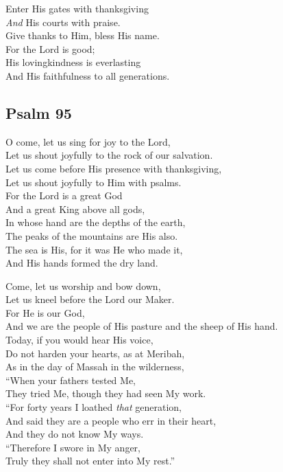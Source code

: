 \documentclass[14pt]{extbook}
\begin{document}
Enter His gates with thanksgiving\\
\emph{And} His courts with praise.\\
Give thanks to Him, bless His name.\\
For the Lord is good;\\
His lovingkindness is everlasting\\
And His faithfulness to all generations.

\newpage
\hypertarget{psalm-95}{%
\subsection{Psalm 95}\label{psalm-95}}

O come, let us sing for joy to the Lord,\\
Let us shout joyfully to the rock of our salvation.\\
Let us come before His presence with thanksgiving,\\
Let us shout joyfully to Him with psalms.\\
For the Lord is a great God\\
And a great King above all gods,\\
In whose hand are the depths of the earth,\\
The peaks of the mountains are His also.\\
The sea is His, for it was He who made it,\\
And His hands formed the dry land.

Come, let us worship and bow down,\\
Let us kneel before the Lord our Maker.\\
For He is our God,\\
And we are the people of His pasture and the sheep of His hand.\\
Today, if you would hear His voice,\\
Do not harden your hearts, as at Meribah,\\
As in the day of Massah in the wilderness,\\
``When your fathers tested Me,\\
They tried Me, though they had seen My work.\\
``For forty years I loathed \emph{that} generation,\\
And said they are a people who err in their heart,\\
And they do not know My ways.\\
``Therefore I swore in My anger,\\
Truly they shall not enter into My rest.''
\end{document}
